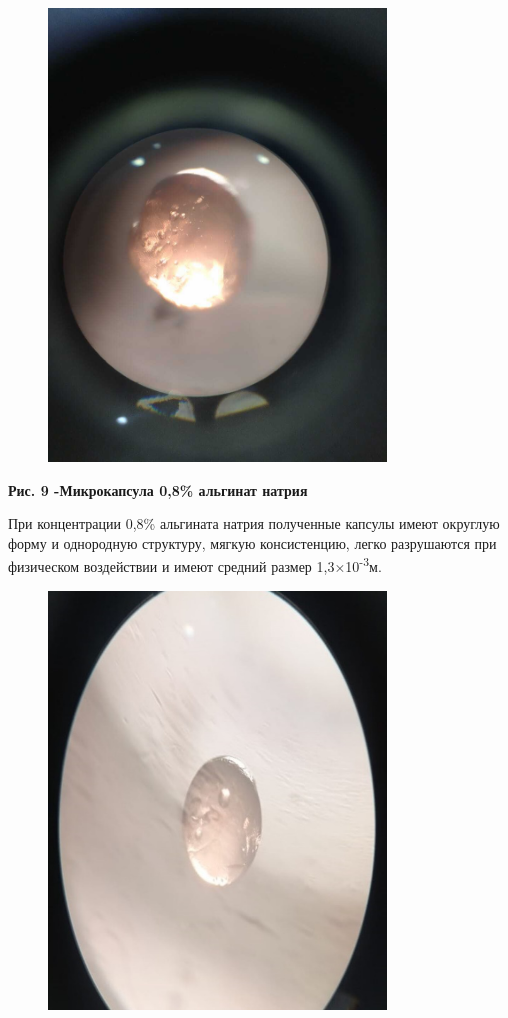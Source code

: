 \begin{figure}[H]
	\centering
	\includegraphics[width=0.8\textwidth]{assets/324}
	\caption*{}
\end{figure}

{\bfseries Рис. 9 -Микрокапсула 0,8\% альгинат натрия}

При концентрации 0,8\% альгината натрия полученные капсулы имеют
округлую форму и однородную структуру, мягкую консистенцию, легко
разрушаются при физическом воздействии и имеют средний размер
1,3×10\textsuperscript{-3}м.

\begin{figure}[H]
	\centering
	\includegraphics[width=0.8\textwidth]{assets/325}
	\caption*{}
\end{figure}

